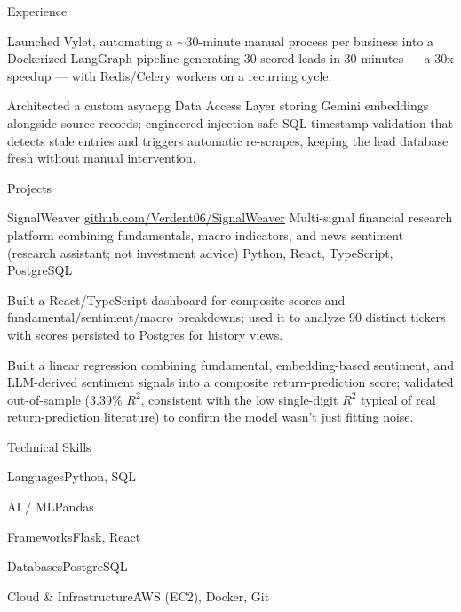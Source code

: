 \documentclass[
	11pt
]{../../../template}
\begin{document}
\begin{rSection}{E}{xperience}
\begin{rSectionEntry}
			\item Launched Vylet, automating a $\sim$30-minute manual process per business into a Dockerized LangGraph pipeline generating 30 scored leads in 30 minutes --- a 30x speedup --- with Redis/Celery workers on a recurring cycle.
			\item Architected a custom asyncpg Data Access Layer storing Gemini embeddings alongside source records; engineered injection-safe SQL timestamp validation that detects stale entries and triggers automatic re-scrapes, keeping the lead database fresh without manual intervention.
		\end{rSectionEntry}
	\end{rSection}

	\begin{rSection}{P}{rojects}
		\begin{rSectionEntry}
			{SignalWeaver}
			{\href{https://github.com/Verdent06/SignalWeaver}{github.com/Verdent06/SignalWeaver}}
			{Multi-signal financial research platform combining fundamentals, macro indicators, and news sentiment (research assistant; not investment advice)}
			{Python, React, TypeScript, PostgreSQL}
			{}

			\item Built a React/TypeScript dashboard for composite scores and fundamental/sentiment/macro breakdowns; used it to analyze 90 distinct tickers with scores persisted to Postgres for history views.
			\item Built a linear regression combining fundamental, embedding-based sentiment, and LLM-derived sentiment signals into a composite return-prediction score; validated out-of-sample (3.39\% $R^{2}$, consistent with the low single-digit $R^{2}$ typical of real return-prediction literature) to confirm the model wasn't just fitting noise.
		\end{rSectionEntry}
	\end{rSection}

	\begin{rSection}{T}{echnical Skills}
		\begin{rSet}{Languages}{Python, SQL}
		\end{rSet}
		\begin{rSet}{AI / ML}{Pandas}
		\end{rSet}
		\begin{rSet}{Frameworks}{Flask, React}
		\end{rSet}
		\begin{rSet}{Databases}{PostgreSQL}
		\end{rSet}
		\begin{rSet}{Cloud \& Infrastructure}{AWS (EC2), Docker, Git}
		\end{rSet}
	\end{rSection}
\end{document}
